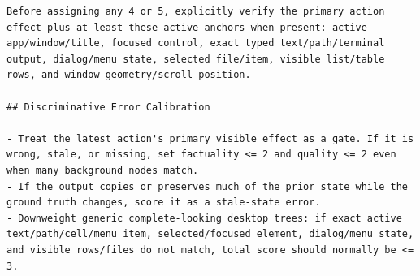\begin{lstlisting}
Before assigning any 4 or 5, explicitly verify the primary action effect plus at least these active anchors when present: active app/window/title, focused control, exact typed text/path/terminal output, dialog/menu state, selected file/item, visible list/table rows, and window geometry/scroll position.

## Discriminative Error Calibration

- Treat the latest action's primary visible effect as a gate. If it is wrong, stale, or missing, set factuality <= 2 and quality <= 2 even when many background nodes match.
- If the output copies or preserves much of the prior state while the ground truth changes, score it as a stale-state error.
- Downweight generic complete-looking desktop trees: if exact active text/path/cell/menu item, selected/focused element, dialog/menu state, and visible rows/files do not match, total score should normally be <= 3.
\end{lstlisting}
